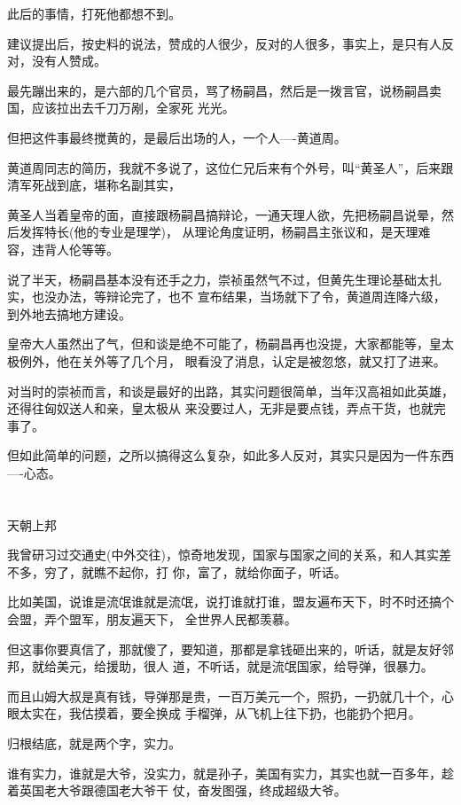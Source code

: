 \documentclass[11pt,a4paper,onecolumn]{article}
\begin{document}
此后的事情，打死他都想不到。

建议提出后，按史料的说法，赞成的人很少，反对的人很多，事实上，是只有人反对，没有人赞成。

最先蹦出来的，是六部的几个官员，骂了杨嗣昌，然后是一拨言官，说杨嗣昌卖国，应该拉出去千刀万剐，全家死
光光。

但把这件事最终搅黄的，是最后出场的人，一个人----黄道周。

黄道周同志的简历，我就不多说了，这位仁兄后来有个外号，叫``黄圣人''，后来跟清军死战到底，堪称名副其实，

黄圣人当着皇帝的面，直接跟杨嗣昌搞辩论，一通天理人欲，先把杨嗣昌说晕，然后发挥特长(他的专业是理学)，
从理论角度证明，杨嗣昌主张议和，是天理难容，违背人伦等等。

说了半天，杨嗣昌基本没有还手之力，崇祯虽然气不过，但黄先生理论基础太扎实，也没办法，等辩论完了，也不
宣布结果，当场就下了令，黄道周连降六级，到外地去搞地方建设。

皇帝大人虽然出了气，但和谈是绝不可能了，杨嗣昌再也没提，大家都能等，皇太极例外，他在关外等了几个月，
眼看没了消息，认定是被忽悠，就又打了进来。

对当时的崇祯而言，和谈是最好的出路，其实问题很简单，当年汉高祖如此英雄，还得往匈奴送人和亲，皇太极从
来没要过人，无非是要点钱，弄点干货，也就完事了。

但如此简单的问题，之所以搞得这么复杂，如此多人反对，其实只是因为一件东西----心态。

\section[\thesection]{}

天朝上邦

我曾研习过交通史(中外交往)，惊奇地发现，国家与国家之间的关系，和人其实差不多，穷了，就瞧不起你，打
你，富了，就给你面子，听话。

比如美国，说谁是流氓谁就是流氓，说打谁就打谁，盟友遍布天下，时不时还搞个会盟，弄个盟军，朋友遍天下，
全世界人民都羡慕。

但这事你要真信了，那就傻了，要知道，那都是拿钱砸出来的，听话，就是友好邻邦，就给美元，给援助，很人
道，不听话，就是流氓国家，给导弹，很暴力。

而且山姆大叔是真有钱，导弹那是贵，一百万美元一个，照扔，一扔就几十个，心眼太实在，我估摸着，要全换成
手榴弹，从飞机上往下扔，也能扔个把月。

归根结底，就是两个字，实力。

谁有实力，谁就是大爷，没实力，就是孙子，美国有实力，其实也就一百多年，趁着英国老大爷跟德国老大爷干
仗，奋发图强，终成超级大爷。
\end{document}

